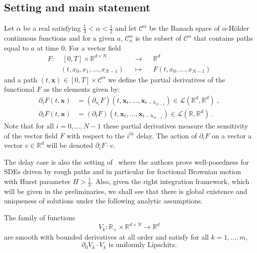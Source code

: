 \documentclass[11pt]{article}
\theoremstyle{definition}
\numberwithin{equation}{section}
\numberwithin{figure}{section}
\numberwithin{table}{section}
\newcommand*\half{\frac{1}{2}}
\newcommand*\third{\frac{1}{3}}
\newcommand*\pa{\partial}
\newcommand{\alp}{\alpha}%
\newcommand*\R{\mathbb{R}}
\newcommand*\Cc{\mathcal{C}}
\newcommand*\Lc{\mathcal{L}}
\newcommand*\xb{\mathbf{x}}
\begin{document}

\subsection{Setting and main statement}
Let $\alpha$ be a real satisfying $\third < \alpha < \half$ and let $\Cc^\alpha$ be the Banach space of $\alpha$-H\"older continuous functions and for a given $a$, $\Cc^\alpha_{a}$ is the subset of $\Cc^\alpha$ that contains paths equal to $a$ at time $0$. For a vector field
\[
\begin{aligned}
F: &\;[0,T]\times \R^{d\times N}&  &\to & &\R^d\\
& (t, x_0, x_1, \dots, x_{N-1})& &\mapsto & &F\left(t, x_0, \dots, x_{N-1} \right)
\end{aligned}
\]
and a path $(t,\xb)\in [0,T]\times \Cc^\alp$ we define the partial derivatives of the functional $F$ as the elements given by:
\begin{align}\label{def:partial-derivatives}
\pa_i F(t,\xb)&=(\pa_{x_i}F)(t,\xb_t,\dots,\xb_{t-h_{N-1}}) \in \Lc(\R^d, \R^d) \ ,\\
\pa_t F(t,\xb)&=(\pa_{t}F)(t,\xb_t,\dots,\xb_{t-h_{N-1}})\in \Lc(\R, \R^d) \ .
\end{align}
Note that for all $i=0,\dots, N-1$ these partial derivatives measure the sensitivity of the vector field $F$ with respect to the $i^{th}$ delay. The action of $\pa_i F$ on a vector a vector $v \in \R^d$ will be denoted $\pa_i F \cdot v$.

The delay case is also the setting of~\cite{nnt2008} where the authors prove well-posedness for SDEs driven by rough paths and in particular for fractional Brownian motion with Hurst parameter $H>\third$. Also, given the right integration framework, which will be given in the preliminaries, we shall see that there is global existence and uniqueness of solutions under the following analytic assumptions.

\begin{assumption}\label{assumptions:analytic}
The family of functions
\[
V_k:\R_+\times \R^{d\times N}\to \R^d
\]
are smooth with bounded derivatives at all order and satisfy for all $k=1,\dots, m$,
\begin{equation}\label{eq:lip_product}
\pa_0 V_k \cdot V_k \text{ is uniformly Lipschitz}.
\end{equation}
\end{assumption}
\end{document}
